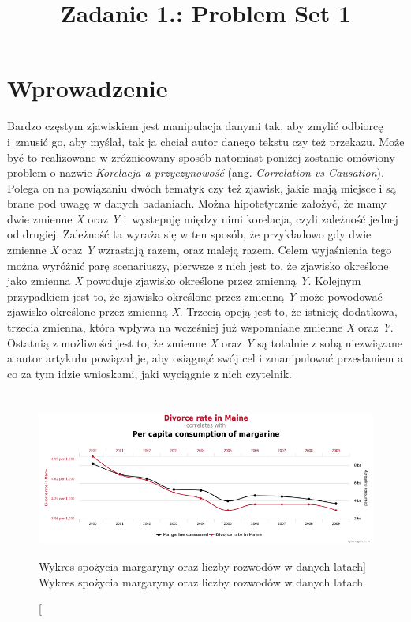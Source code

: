 \documentclass{classrep}
\author{%
    \studentinfo[239676@edu.p.lodz.pl]{Kamil Kowalewski}{239676}
}
\title{Zadanie 1.: Problem Set 1}
\begin{document}
    \maketitle
    \thispagestyle{fancyplain}

    \section{Wprowadzenie} {
        Bardzo częstym zjawiskiem jest manipulacja danymi tak, aby zmylić odbiorcę
        i~zmusić go, aby myślał, tak ja chciał autor danego tekstu czy też przekazu.
        Może być to realizowane w zróżnicowany sposób natomiast poniżej zostanie
        omówiony problem o nazwie \emph{Korelacja a przyczynowość}
        (ang. \emph{Correlation vs Causation}). Polega on na powiązaniu dwóch tematyk
        czy też zjawisk, jakie mają miejsce i są brane pod uwagę w danych badaniach.
        Można hipotetycznie założyć, że mamy dwie zmienne \textit{X} oraz \textit{Y}
        i~wystepuję między nimi korelacja, czyli zależność jednej od drugiej. Zależność
        ta wyraża się w ten sposób, że przykładowo gdy dwie zmienne \textit{X}
        oraz \textit{Y} wzrastają razem, oraz maleją razem. Celem wyjaśnienia tego można
        wyróżnić parę scenariuszy, pierwsze z nich jest to, że zjawisko określone jako
        zmienna \textit{X} powoduje zjawisko określone przez zmienną \textit{Y}.
        Kolejnym przypadkiem jest to, że zjawisko określone przez zmienną \textit{Y}
        może powodować zjawisko określone przez zmienną \textit{X}. Trzecią opcją jest
        to, że istnieję dodatkowa, trzecia zmienna, która wpływa na wcześniej już
        wspomniane zmienne \textit{X} oraz \textit{Y}. Ostatnią z możliwości jest to,
        że zmienne \textit{X} oraz \textit{Y} są totalnie z sobą niezwiązane a autor
        artykułu powiązał je, aby osiągnąć swój cel i zmanipulować przesłaniem a co za
        tym idzie wnioskami, jaki wyciągnie z nich czytelnik.
    }

    \section{} {
        \begin{figure}[!htbp]
            \centering
            \includegraphics[width=\textwidth,keepaspectratio]{img/margarine_divorces.png}
            \caption
            [Wykres spożycia margaryny oraz liczby rozwodów w danych latach]
            {Wykres spożycia margaryny oraz liczby rozwodów w danych latach}
            \label{margarine_divorces}
        \end{figure}
        \FloatBarrier
    }
\end{document}
